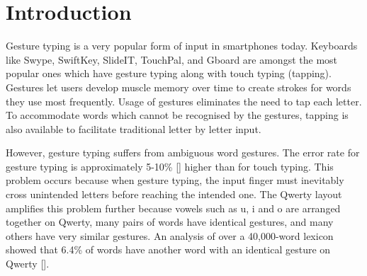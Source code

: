 \documentclass[MTech]{iitmdiss}
\begin{document}




\clearpage




\chapter{Introduction}
\label{chap:intro}


Gesture typing is a very popular form of input in smartphones today. Keyboards like Swype, SwiftKey, SlideIT, TouchPal, and Gboard are amongst the most popular ones which have gesture typing along with touch typing (tapping). Gestures let users develop muscle memory over time to create strokes for words they use most frequently. Usage of gestures eliminates the need to tap each letter. To accommodate words which cannot be recognised by the gestures, tapping is also available to facilitate traditional letter by letter input.




However, gesture typing suffers from ambiguous word gestures. The error rate for gesture typing is approximately 5-10\% [\cite{evaluation}] higher than for touch typing.  This problem occurs because when gesture typing, the input finger must inevitably cross unintended letters before reaching the intended one. The Qwerty layout amplifies this problem further because vowels such as u, i and o are arranged together on Qwerty, many pairs of words have
identical gestures, and many others have very similar gestures. An analysis of over a 40,000-word lexicon showed that 6.4\% of words have another word with an identical gesture on Qwerty [\cite{gesturerecog}].
\end{document}

